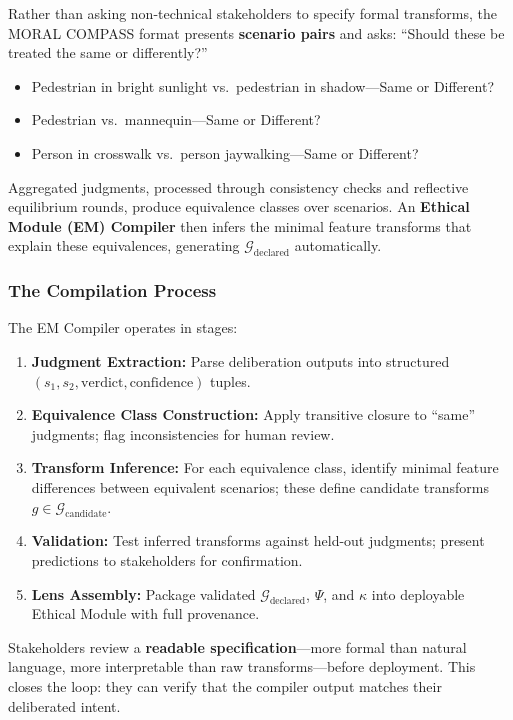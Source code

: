 \documentclass[12pt]{article}
\begin{document}
Rather than asking non-technical stakeholders to specify formal transforms, the MORAL COMPASS format presents \textbf{scenario pairs} and asks: ``Should these be treated the same or differently?''

\begin{itemize}
\item Pedestrian in bright sunlight vs.\ pedestrian in shadow---Same or Different?
\item Pedestrian vs.\ mannequin---Same or Different?
\item Person in crosswalk vs.\ person jaywalking---Same or Different?
\end{itemize}

Aggregated judgments, processed through consistency checks and reflective equilibrium rounds,
produce equivalence classes over scenarios. An \textbf{Ethical Module (EM) Compiler} then infers the
minimal feature transforms that explain these equivalences, generating $\mathcal{G}_{\text{declared}}$ automatically.

\subsubsection{The Compilation Process}

The EM Compiler operates in stages:

\begin{enumerate}
\item \textbf{Judgment Extraction:} Parse deliberation outputs into structured $(s_1, s_2, \text{verdict}, \text{confidence})$
tuples.
\item \textbf{Equivalence Class Construction:} Apply transitive closure to ``same'' judgments; flag
inconsistencies for human review.
\item \textbf{Transform Inference:} For each equivalence class, identify minimal feature differences between equivalent scenarios; these define candidate transforms $g \in \mathcal{G}_{\text{candidate}}$.
\item \textbf{Validation:} Test inferred transforms against held-out judgments; present predictions to
stakeholders for confirmation.
\item \textbf{Lens Assembly:} Package validated $\mathcal{G}_{\text{declared}}$, $\Psi$, and $\kappa$ into deployable Ethical Module with
full provenance.
\end{enumerate}

Stakeholders review a \textbf{readable specification}---more formal than natural language, more interpretable than raw transforms---before deployment. This closes the loop: they can verify that
the compiler output matches their deliberated intent.
\end{document}
